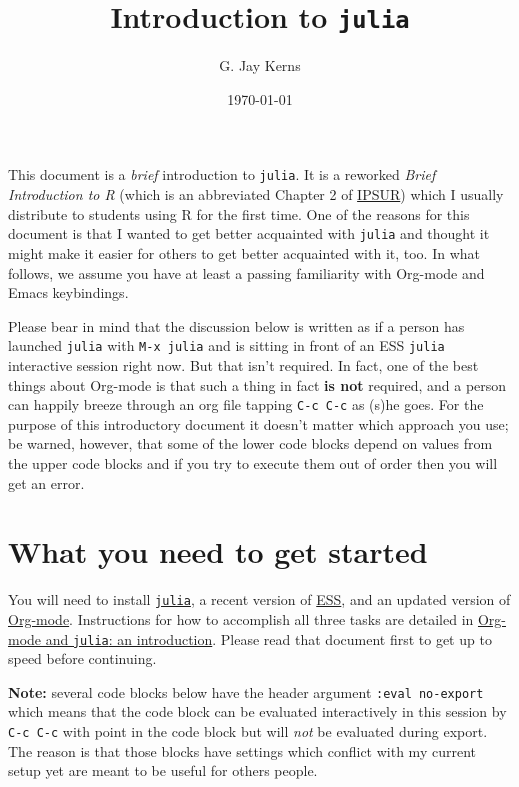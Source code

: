 \documentclass[11pt]{article}
\author{G. Jay Kerns}
\date{\today}
\title{Introduction to \texttt{julia}}
\begin{document}
\maketitle
\tableofcontents

\vspace{0.25in}

This document is a \emph{brief} introduction to \texttt{julia}. It is a reworked
\emph{Brief Introduction to R} (which is an abbreviated Chapter 2 of \href{http:ipsur.org}{IPSUR})
which I usually distribute to students using R for the first time.
One of the reasons for this document is that I wanted to get better
acquainted with \texttt{julia} and thought it might make it easier for others
to get better acquainted with it, too. In what follows, we assume you
have at least a passing familiarity with Org-mode and Emacs
keybindings.

Please bear in mind that the discussion below is written as if a
person has launched \texttt{julia} with \texttt{M-x julia} and is sitting in front
of an ESS \texttt{julia} interactive session right now.  But that isn't
required.  In fact, one of the best things about Org-mode is that such
a thing in fact \textbf{is not} required, and a person can happily breeze
through an org file tapping \texttt{C-c C-c} as (s)he goes.  For the purpose
of this introductory document it doesn't matter which approach you
use; be warned, however, that some of the lower code blocks depend on
values from the upper code blocks and if you try to execute them out
of order then you will get an error.

\section[What you need to get started]{What you need to get started}
\label{sec-1}

You will need to install \href{http://julialang.org}{\texttt{julia}}, a recent version of \href{http://ess.r-project.org}{ESS}, and an
updated version of \href{http://orgmode.org}{Org-mode}.  Instructions for how to accomplish all
three tasks are detailed in \href{file://ob-julia-doc.org}{Org-mode and \texttt{julia}: an introduction}.
Please read that document first to get up to speed before continuing.

\textbf{Note:} several code blocks below have the header argument \texttt{:eval
  no-export} which means that the code block can be evaluated
  interactively in this session by \texttt{C-c C-c} with point in the code
  block but will \emph{not} be evaluated during export.  The reason is that
  those blocks have settings which conflict with my current setup yet
  are meant to be useful for others people.
\end{document}
